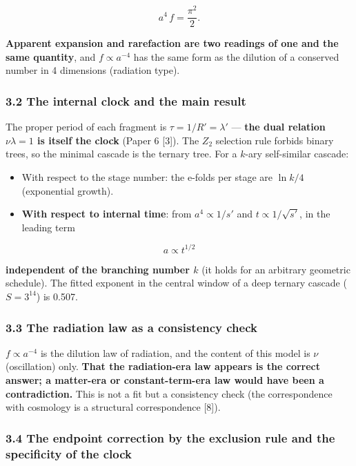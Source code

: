 \documentclass[
]{article}
\providecommand{\tightlist}{%
  \setlength{\itemsep}{0pt}\setlength{\parskip}{0pt}}
\begin{document}
\[
a^4\,f=\frac{\pi^2}{2}.
\]

\textbf{Apparent expansion and rarefaction are two readings of one and
the same quantity}, and \(f\propto a^{-4}\) has the same form as the
dilution of a conserved number in 4 dimensions (radiation type).

\subsubsection{3.2 The internal clock and the main
result}\label{the-internal-clock-and-the-main-result}

The proper period of each fragment is \(\tau=1/R'=\lambda'\) ---
\textbf{the dual relation \(\nu\lambda=1\) is itself the clock} (Paper 6
{[}3{]}). The \(Z_2\) selection rule forbids binary trees, so the
minimal cascade is the ternary tree. For a \(k\)-ary self-similar
cascade:

\begin{itemize}
\tightlist
\item
  With respect to the stage number: the e-folds per stage are
  \(\ln k/4\) (exponential growth).
\item
  \textbf{With respect to internal time}: from \(a^4\propto1/s'\) and
  \(t\propto1/\sqrt{s'}\), in the leading term
\end{itemize}

\[
\boxed{\;a\propto t^{1/2}\;}
\]

\textbf{independent of the branching number \(k\)} (it holds for an
arbitrary geometric schedule). The fitted exponent in the central window
of a deep ternary cascade (\(S=3^{14}\)) is 0.507.

\subsubsection{3.3 The radiation law as a consistency
check}\label{the-radiation-law-as-a-consistency-check}

\(f\propto a^{-4}\) is the dilution law of radiation, and the content of
this model is \(\nu\) (oscillation) only. \textbf{That the radiation-era
law appears is the correct answer; a matter-era or constant-term-era law
would have been a contradiction.} This is not a fit but a consistency
check (the correspondence with cosmology is a structural correspondence
{[}8{]}).

\subsubsection{3.4 The endpoint correction by the exclusion rule and the
specificity of the
clock}\label{the-endpoint-correction-by-the-exclusion-rule-and-the-specificity-of-the-clock}
\end{document}
